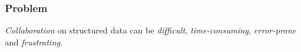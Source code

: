 \begin{frame}[fragile]
  \frametitle{Problem}
  \begin{center}
    \Large \emph{Collaboration} on structured data can be \emph{difficult}, \emph{time-consuming}, \emph{error-prone} and \emph{frustrating}.
  \end{center}
\end{frame}